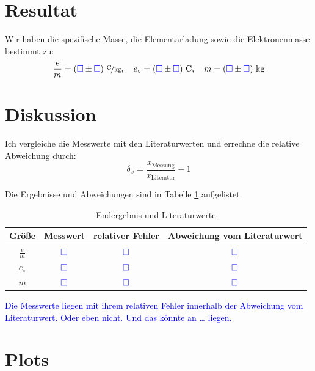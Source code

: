 \documentclass[11pt, ngerman]{article}
\newcommand{\emesswert}{\left(\messwert \pm \messwert \right)}
\newcommand{\messwert}{\textcolor{blue}{\square}}
\begin{document}
\section{Resultat}

Wir haben die spezifische Masse, die Elementarladung sowie die Elektronenmasse
bestimmt zu:
\[
	\frac em = \unitfrac[\emesswert]C{kg}
	, \quad
	e_\circ = \unit[\emesswert]C
	, \quad
	m = \unit[\emesswert]{kg}
\]



\section{Diskussion}

Ich vergleiche die Messwerte mit den Literaturwerten und errechne die relative
Abweichung durch:
\[ \delta_x = \frac{x_\text{Messung}}{x_\text{Literatur}} -1 \]

Die Ergebnisse und Abweichungen sind in Tabelle \ref{table:Diskussion}
aufgelistet.

\begin{table}[h!]
	\centering

	\begin{tabular}{cccc}
		Größe & Messwert & relativer Fehler & Abweichung vom Literaturwert \\
		\hline
		$\frac em$ & $\messwert$ & $\messwert$ & $\messwert$ \\
		$e_\circ$ & $\messwert$ & $\messwert$ & $\messwert$ \\
		$m$ & $\messwert$ & $\messwert$ & $\messwert$
	\end{tabular}

	\caption{Endergebnis und Literaturwerte}
	\label{table:Diskussion}
\end{table}

\textcolor{blue}{Die Messwerte liegen mit ihrem relativen Fehler innerhalb der
Abweichung vom Literaturwert. Oder eben nicht. Und das könnte an … liegen.}




\newpage

\section{Plots}
\end{document}
